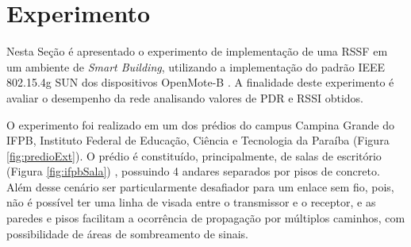 \chapter{Experimento}
\label{experimento}

Nesta Seção é apresentado o experimento de implementação de uma RSSF em um ambiente de \emph{Smart Building}, utilizando a implementação do padrão IEEE 802.15.4g SUN dos dispositivos OpenMote-B \cite{tuset2020dataset}. A finalidade deste experimento é avaliar o desempenho da rede analisando valores de PDR e RSSI obtidos.

O experimento foi realizado em um dos prédios do campus Campina Grande do IFPB, Instituto Federal de Educação, Ciência e Tecnologia da Paraíba (Figura \ref{fig:predioExt}). O prédio é constituído, principalmente, de salas de escritório (Figura \ref{fig:ifpbSala}) , possuindo 4 andares separados por pisos de concreto. Além desse cenário ser particularmente desafiador para um enlace sem fio, pois, não é possível ter uma linha de visada entre o transmissor e o receptor, e as paredes e pisos facilitam a ocorrência de propagação por múltiplos caminhos, com possibilidade de áreas de sombreamento de sinais.


